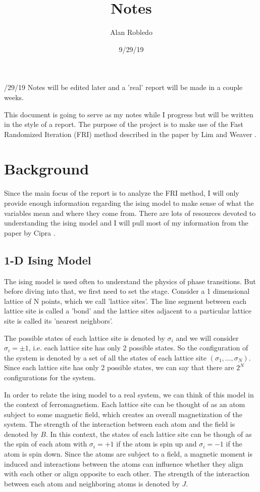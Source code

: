 \documentclass{article}
\title{Notes}
\date{9/29/19}
\author{Alan Robledo}
\begin{document}
/29/19 Notes will be edited later and a 'real' report will be made in a couple weeks.

This document is going to serve as my notes while I progress but will be written in the style of a report.
The purpose of the project is to make use of the Fast Randomized Iteration (FRI) method described in the paper by Lim and Weaver \cite{lim_weare}.
\section{Background}
Since the main focus of the report is to analyze the FRI method, I will only provide enough information regarding the ising model to make sense of what the variables mean and where they come from. There are lots of resources devoted to understanding the ising model and I will pull most of my information from the paper by Cipra \cite{cipra}.

\subsection{1-D Ising Model}
The ising model is used often to understand the physics of phase transitions.
But before diving into that, we first need to set the stage.
Consider a 1 dimensional lattice of N points, which we call 'lattice sites'.
The line segment between each lattice site is called a 'bond' and the lattice sites adjacent to a particular lattice site is called its 'nearest neighbors'.

The possible states of each lattice site is denoted by $\sigma_i$ and we will consider $\sigma_i = \pm 1$, i.e. each lattice site has only 2 possible states.
So the configuration of the system is denoted by a set of all the states of each lattice site $(\sigma_1, \dots, \sigma_N)$.
Since each lattice site has only 2 possible states, we can say that there are $2^N$ configurations for the system.

In order to relate the ising model to a real system, we can think of this model in the context of ferromagnetism.
Each lattice site can be thought of as an atom subject to some magnetic field, which creates an overall magnetization of the system.
The strength of the interaction between each atom and the field is denoted by $B$.
In this context, the states of each lattice site can be though of as the spin of each atom with $\sigma_i = +1$ if the atom is spin up and $\sigma_i = -1$ if the atom is spin down.
Since the atoms are subject to a field, a magnetic moment is induced and interactions between the atoms can influence whether they align with each other or align opposite to each other.
The strength of the interaction between each atom and neighboring atoms is denoted by $J$.
\end{document}
